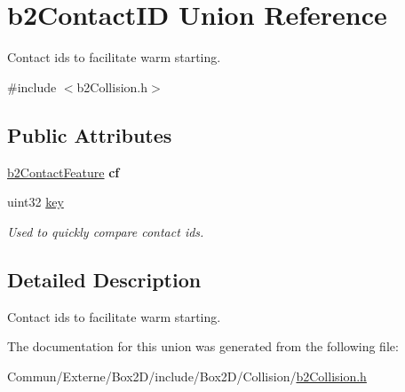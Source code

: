 \hypertarget{unionb2_contact_i_d}{}\section{b2\+Contact\+ID Union Reference}
\label{unionb2_contact_i_d}


Contact ids to facilitate warm starting.  




{\ttfamily \#include $<$b2\+Collision.\+h$>$}

\subsection*{Public Attributes}
\begin{DoxyCompactItemize}
\item 
\hyperlink{structb2_contact_feature}{b2\+Contact\+Feature} {\bfseries cf}\hypertarget{unionb2_contact_i_d_a58b6732f909bc760f75e7aff3cd4be08}{}\label{unionb2_contact_i_d_a58b6732f909bc760f75e7aff3cd4be08}

\item 
uint32 \hyperlink{unionb2_contact_i_d_a04c04f8fdcb799b33552d01b3aa3f245}{key}\hypertarget{unionb2_contact_i_d_a04c04f8fdcb799b33552d01b3aa3f245}{}\label{unionb2_contact_i_d_a04c04f8fdcb799b33552d01b3aa3f245}

\begin{DoxyCompactList}\small\item\em Used to quickly compare contact ids. \end{DoxyCompactList}\end{DoxyCompactItemize}


\subsection{Detailed Description}
Contact ids to facilitate warm starting. 

The documentation for this union was generated from the following file\+:\begin{DoxyCompactItemize}
\item 
Commun/\+Externe/\+Box2\+D/include/\+Box2\+D/\+Collision/\hyperlink{b2_collision_8h}{b2\+Collision.\+h}\end{DoxyCompactItemize}
